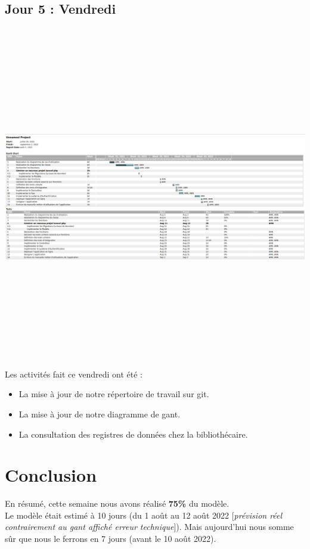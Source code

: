 \documentclass[12pt,a4paper]{article}
\begin{document}
\subsection{Jour 5 : Vendredi}
\includegraphics[height=15cm,width=22cm]{images/jour5.png}
Les activités fait ce vendredi ont été :
\begin{itemize}
\item La mise à jour de notre répertoire de travail sur git.
\item La mise à jour de notre diagramme de gant.
\item La consultation des registres de données chez la bibliothécaire.
\end{itemize}
\section{Conclusion}
	En résumé, cette semaine nous avons réalisé \textbf{75\%} du modèle.\\
	Le modèle était estimé à 10 jours (du 1 août au 12 août 2022 [\textit{prévision réel contrairement au gant affiché erreur technique}]). Mais aujourd'hui nous somme sûr que nous le ferrons en 7 jours (avant le 10 août 2022).
\end{document}
